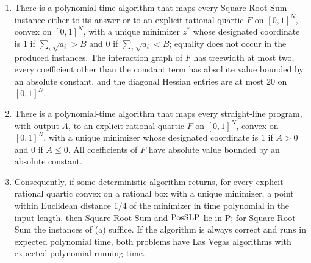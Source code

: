 \begin{theorem}\label{thm:points-quartic-lower}
\leavevmode
\begin{enumerate}[label=(\alph*)]
\item There is a polynomial-time algorithm that maps every Square Root Sum
instance either to its answer or to an explicit rational quartic $F$ on
$[0,1]^N$, convex on $[0,1]^N$, with a unique minimizer $z^*$ whose
designated coordinate is $1$ if $\sum_i\sqrt{a_i}>B$ and $0$ if
$\sum_i\sqrt{a_i}<B$; equality does not occur in the produced instances. The
interaction graph of $F$ has treewidth at most two, every coefficient other
than the constant term has absolute value bounded by an absolute constant,
and the diagonal Hessian entries are at most $20$ on $[0,1]^N$.
\item There is a polynomial-time algorithm that maps every straight-line
program, with output $A$, to an explicit rational quartic $F$ on $[0,1]^N$,
convex on $[0,1]^N$, with a unique minimizer whose designated coordinate is
$1$ if $A>0$ and $0$ if $A\le0$. All coefficients of $F$ have absolute value
bounded by an absolute constant.
\item Consequently, if some deterministic algorithm returns, for every
explicit rational quartic convex on a rational box with a unique minimizer,
a point within Euclidean distance $1/4$ of the minimizer in time polynomial
in the input length, then Square Root Sum and $\mathrm{PosSLP}$ lie in $\mathrm P$; for Square
Root Sum the instances of (a) suffice. If the algorithm is always correct and
runs in expected polynomial time, both problems have Las Vegas algorithms
with expected polynomial running time.
\end{enumerate}
\end{theorem}

